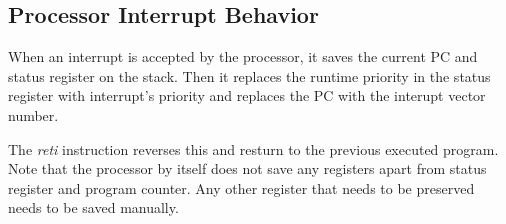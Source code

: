 \subsection{Processor Interrupt Behavior}
\label{sec:InterruptEntryCPU}
When an interrupt is accepted by the processor, it saves the current PC and status register on the stack.
Then it replaces the runtime priority in the status register with interrupt's priority and replaces the PC with the interupt vector number.

The \textit{reti} instruction reverses this and resturn to the previous executed program.
Note that the processor by itself does not save any registers apart from status register and program counter.
Any other register that needs to be preserved needs to be saved manually.
